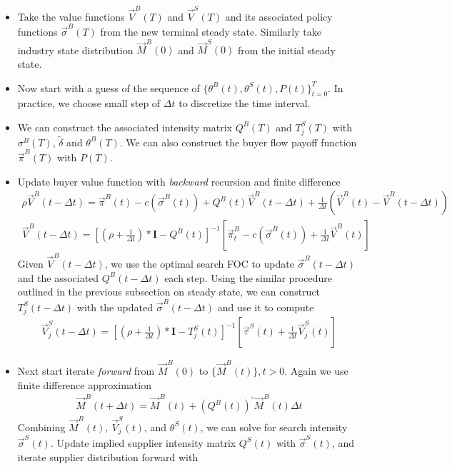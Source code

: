 \documentclass[12pt]{article} \usepackage{amsmath,amssymb,amsthm,geometry,graphicx,setspace,algorithm,algpseudocode,float}
\begin{document}
\begin{itemize}
\item Take the value functions $\vec{V}^B(T)$ and $\vec{V}^S(T)$ and its associated policy functions $\vec{\sigma}^B(T)$ from the new terminal steady state. Similarly take industry state distribution $\vec{M}^B(0)$ and $\vec{M}^S(0)$ from the initial steady state.
\item Now start with a guess of the sequence of $\{\theta^B(t), \theta^S(t), P(t)\}_{t=0}^T$. In practice, we choose small step of $\Delta t$ to discretize the time interval.  
\item We can construct the associated intensity matrix $Q^B(T)$ and $T_j^S(T)$ with $\sigma^B(T)$, $\tilde{\delta}$ and $\theta^B(T)$. We can also construct the buyer flow payoff function $\vec{\pi}^B(T)$ with $P(T)$. 
\item Update buyer value function with \textit{backward} recursion and finite difference 
     \begin{eqnarray*}
		\rho \vec{V}^B(t-\Delta t) = \vec{\pi}^B(t)-c(\vec{\sigma}^B(t)) + Q^B(t) \vec{V}^B (t-\Delta t)+\frac{1}{\Delta t} (\vec{V}^B(t)-\vec{V}^B(t-\Delta t))\\ 
		\vec{V}^B(t-\Delta t) = [(\rho+\frac{1}{\Delta t})*\mathbf{I}-Q^B(t)]^{-1}[\vec{\pi}^B_t-c(\vec{\sigma}^B(t))+\frac{1}{\Delta t} \vec{V}^B(t)]
		\end{eqnarray*}
Given $\vec{V}^B(t-\Delta t)$, we use the optimal search FOC to update $\vec{\sigma}^B(t-\Delta t)$ and the associated $Q^B(t-\Delta t)$ each step. Using the similar procedure outlined in the previous subsection on steady state, we can construct $T_j^S(t-\Delta t)$ with the updated $\vec{\sigma}^B(t-\Delta t)$ and use it to compute 
    \begin{eqnarray*}
		\vec{V}_j^S(t-\Delta t) = [(\rho+\frac{1}{\Delta t})*\mathbf{I}-T_j^S(t)]^{-1}[\vec{\tau}^S(t)+\frac{1}{\Delta t} \vec{V}_j^S(t)]
		\end{eqnarray*}
\item Next start iterate \textit{forward} from $\vec{M}^B(0)$ to $\{\vec{M}^B(t)\}, t>0$. Again we use finite difference approximation
	\begin{eqnarray*}
	\vec{M}^B(t+\Delta t) = \vec{M}^B(t) + (Q^B(t))^{\prime} \vec{M}^B(t)\Delta t
	\end{eqnarray*}
Combining $\vec{M}^B(t)$, $\vec{V}_j^S(t)$, and $\theta^S(t)$, we can solve for search intensity $\vec{\sigma}^S(t)$. Update implied supplier intensity matrix $Q^S(t)$ with $\vec{\sigma}^S(t)$, and iterate supplier distribution forward with

\end{itemize}
\end{document}
